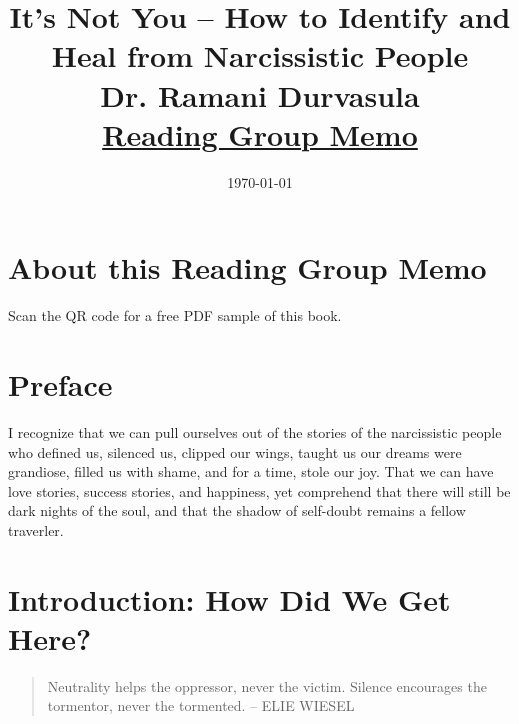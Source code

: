 \documentclass[11pt,letter]{article}
\title{It's Not You -- How to Identify and Heal from Narcissistic People\\ Dr. Ramani Durvasula\\ \ul{Reading Group Memo}}
\author{}
\date{\today}
\begin{document}
\maketitle

\section*{About this Reading Group Memo}

\begin{tipbox}
\quad Scan the QR code for a free PDF sample of this book.
\end{tipbox}

\section*{Preface}

I recognize that we can pull ourselves out of the stories of the narcissistic
people who defined us, silenced us, clipped our wings, taught us our dreams
were grandiose, filled us with shame, and for a time, stole our joy.  That we
can have love stories, success stories, and happiness, yet comprehend that
there will still be dark nights of the soul, and that the shadow of self-doubt
remains a fellow traverler.

\section*{Introduction: How Did We Get Here?}

\begin{quote}
Neutrality helps the oppressor, never the victim. Silence encourages the tormentor, never the tormented.
\flushright -- ELIE WIESEL
\end{quote}
\end{document}
